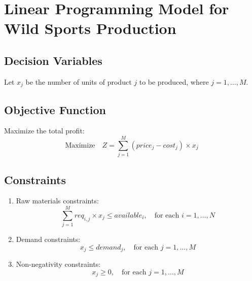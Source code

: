 \documentclass{article}
\begin{document}
\section*{Linear Programming Model for Wild Sports Production}

\subsection*{Decision Variables}

Let \( x_j \) be the number of units of product \( j \) to be produced, where \( j = 1, \ldots, M \).

\subsection*{Objective Function}

Maximize the total profit:
\[
\text{Maximize} \quad Z = \sum_{j=1}^{M} (price_j - cost_j) \times x_j
\]

\subsection*{Constraints}

\begin{enumerate}
    \item Raw materials constraints:
    \[
    \sum_{j=1}^{M} req_{i,j} \times x_j \leq available_i, \quad \text{for each } i = 1, \ldots, N
    \]
    
    \item Demand constraints:
    \[
    x_j \leq demand_j, \quad \text{for each } j = 1, \ldots, M
    \]
    
    \item Non-negativity constraints:
    \[
    x_j \geq 0, \quad \text{for each } j = 1, \ldots, M
    \]
\end{enumerate}
\end{document}

